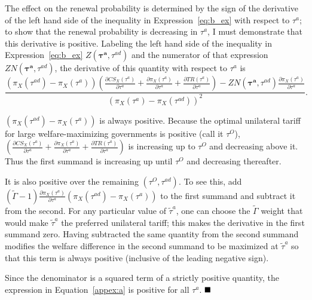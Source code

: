 \documentclass[10pt]{article}
\newcommand{\bta}{\bm{\tau^a}}
\newcommand{\tad}{\tau^{ad}}
\begin{document}
The effect on the renewal probability is determined by the sign of the derivative of the left hand side of the inequality in Expression~\ref{eq:b_ex} with respect to $\tau^a$; to show that the renewal probability is decreasing in $\tau^a$, I must demonstrate that this derivative is positive. Labeling the left hand side of the inequality in Expression~\ref{eq:b_ex} $Z(\bta,\tad)$ and the numerator of that expression $ZN(\bta,\tad)$, the derivative of this quantity with respect to $\tau^{a}$ is 
\begin{equation}
  \frac{\left(\pi_X(\tad) - \pi_X(\tau^a)\right)\left(\frac{\partial \mathit{CS}_X(\tau^{a})}{\partial \tau^{a}} + \frac{\partial \pi_X(\tau^a)}{\partial \tau^{a}} + \frac{\partial \mathit{TR}(\tau^{a})}{\partial \tau^{a}}\right) - ZN(\bta,\tad) \frac{\partial \pi_X(\tau^a)}{\partial \tau^a}}{\left(\pi_X(\tau^a) - \pi_X(\tad)\right)^2}.
  \label{appex:a}
\end{equation}

\noindent $\left(\pi_X(\tad) - \pi_X(\tau^a)\right)$ is always positive. Because the optimal unilateral tariff for large welfare-maximizing governments is positive (call it $\tau^O$), $\left(\frac{\partial \mathit{CS}_X(\tau^{a})}{\partial \tau^{a}} + \frac{\partial \pi_X(\tau^a)}{\partial \tau^{a}} + \frac{\partial \mathit{TR}(\tau^{a})}{\partial \tau^{a}}\right)$ is increasing up to $\tau^O$ and decreasing above it. Thus the first summand is increasing up until $\tau^O$ and decreasing thereafter.

It is also positive over the remaining $(\tau^O,\tad)$. To see this, add $\left(\tilde{\Gamma} - 1 \right) \frac{\partial \pi_X(\tau^a)}{\partial \tau^a} \left(\pi_X(\tad) - \pi_X(\tau^a)\right)$ to the first summand and subtract it from the second. For any particular value of $\tilde{\tau}^a$, one can choose the $\tilde{\Gamma}$ weight that would make $\tilde{\tau}^a$ the preferred unilateral tariff; this makes the derivative in the first summand zero. Having subtracted the same quantity from the second summand modifies the welfare difference in the second summand to be maximized at $\tilde{\tau}^a$ so that this term is always positive (inclusive of the leading negative sign).

Since the denominator is a squared term of a strictly positive quantity, the expression in Equation~\ref{appex:a} is positive for all $\tau^{a}$.  $\hfill\blacksquare$
\end{document}
